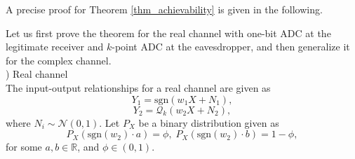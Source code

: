 \documentclass[journal]{IEEEtran}
\begin{document}
A precise proof for Theorem \ref{thm_achievability} is given in the following. 
\begin{IEEEproof}
Let us first prove the theorem for the real channel with one-bit ADC at the legitimate receiver and $k$-point ADC at the eavesdropper, and then generalize it for the complex channel. 
\\ ) Real channel
\\ \indent The input-output relationships for a real channel are given as 
\begin{equation}
    Y_1 = \text{sgn}(w_1 X + N_1),
\end{equation}
\begin{equation}
    Y_2 = \mathcal{Q}_k (w_2 X + N_2),
\end{equation}
where $N_i \sim \mathcal{N}(0,1)$.
Let $P_X$ be a binary distribution given as  
\begin{equation}
    P_X(\text{sgn}(w_2)\cdot a) = \phi, \; P_X(\text{sgn}(w_2)\cdot b) = 1-\phi, \label{eq:binary_dist}
\end{equation}
for some $a,b \in \mathbb{R}$, and $\phi \in (0,1)$.


\end{IEEEproof}
\end{document}
